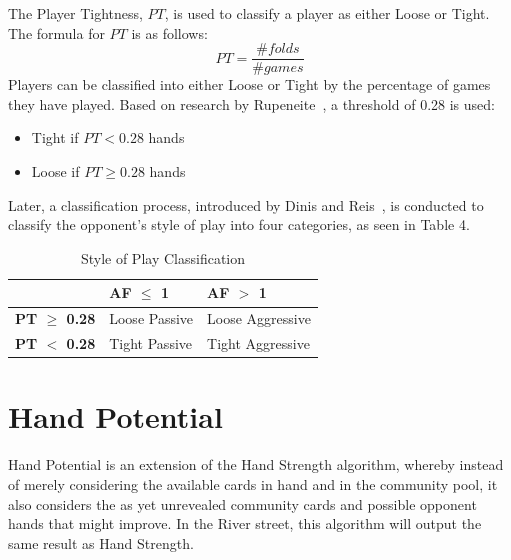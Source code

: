 \documentclass{article}
\begin{document}
The Player Tightness, $PT$, is used to classify a player as either Loose or Tight. The formula for $PT$ is as follows:
\begin{displaymath}
  PT =  \frac{\text{\# }folds}{\text{\# }games} 
\end{displaymath}
\noindent Players can be classified into either Loose or Tight by the percentage of games they have played. Based on research by Rupeneite~, a threshold of 0.28 is used:
\begin{itemize}
	\item Tight if $PT < 0.28$ hands
	\item Loose if $PT \geq 0.28$ hands
\end{itemize}

Later, a classification process, introduced by Dinis and Reis~, is conducted to classify the opponent's style of play into four categories, as seen in Table 4.

\begin{table}[h!]
  \begin{center}
    \begin{tabular}{p{1.5cm}|p{2cm}|p{2cm}}
      \textbf{} & \textbf{AF $\leq$ 1} & \textbf{AF $>$ 1} \\
      \hline
      \textbf{PT $\geq$ 0.28} & Loose \newline Passive & Loose \newline Aggressive \\
      \hline
      \textbf{PT $<$ 0.28} & Tight \newline Passive & Tight \newline Aggressive \\
    \end{tabular}
    \caption{Style of Play Classification}
    \label{tab:table4}
  \end{center}
\end{table}

\iffalse
\section{Hand Potential}

Hand Potential is an extension of the Hand Strength algorithm, whereby instead of merely considering the available cards in hand and in the community pool, it also considers the as yet unrevealed community cards and possible opponent hands that might improve. In the River street, this algorithm will output the same result as Hand Strength.
\end{document}

